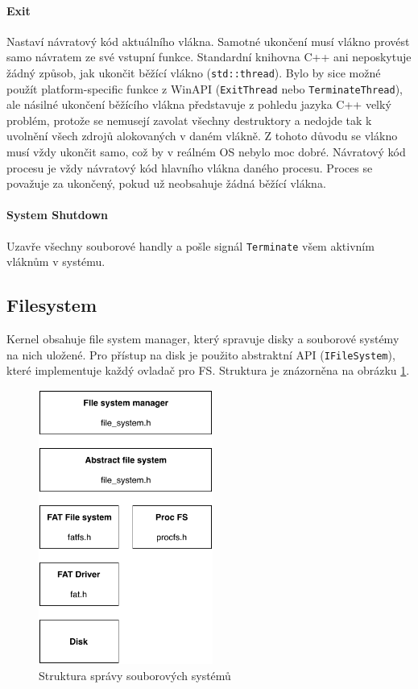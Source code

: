 \documentclass[11pt,a4paper]{scrartcl}
\begin{document}
	\paragraph{Exit}
	Nastaví návratový kód aktuálního vlákna. Samotné ukončení musí vlákno provést samo návratem ze své vstupní funkce. Standardní knihovna C++ ani neposkytuje žádný způsob, jak ukončit běžící vlákno (\verb|std::thread|). Bylo by sice možné použít platform-specific funkce z WinAPI (\verb|ExitThread| nebo \verb|TerminateThread|), ale násilné ukončení běžícího vlákna představuje z pohledu jazyka C++ velký problém, protože se nemusejí zavolat všechny destruktory a nedojde tak k uvolnění všech zdrojů alokovaných v daném vlákně. Z tohoto důvodu se vlákno musí vždy ukončit samo, což by v reálném OS nebylo moc dobré. Návratový kód procesu je vždy návratový kód hlavního vlákna daného procesu. Proces se považuje za ukončený, pokud už neobsahuje žádná běžící vlákna.
	
	\paragraph{System Shutdown}
	Uzavře všechny souborové handly a pošle signál \verb|Terminate| všem aktivním vláknům v systému.

	
	\subsection{Filesystem}
	
	Kernel obsahuje file system manager, který spravuje disky a souborové systémy na nich uložené. Pro přístup na disk je použito abstraktní API (\verb|IFileSystem|), které implementuje každý ovladač pro FS. Struktura je znázorněna na obrázku \ref{fig:fs-layers}.
	
	\begin{figure}[H]
		\centering
		\includegraphics[height=9cm]{fs-layers.pdf}
		\caption{Struktura správy souborových systémů}
		\label{fig:fs-layers}
	\end{figure}
\end{document}
